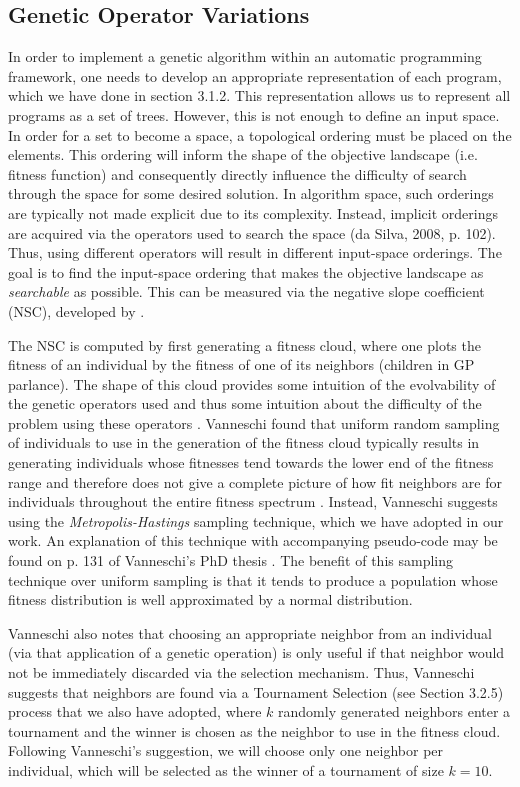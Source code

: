 \documentclass[a4paper,12pt]{report} 	%
\numberwithin{figure}{chapter}
\numberwithin{table}{chapter}
\numberwithin{equation}{chapter}
\begin{document}
\begin{flushleft}
\section{Genetic Operator Variations}
In order to implement a genetic algorithm within an automatic programming framework, one needs to develop an appropriate representation of each program, which we have done in section 3.1.2. This representation allows us to represent all programs as a set of trees. However, this is not enough to define an input space. In order for a set to become a space, a topological ordering must be placed on the elements. This ordering will inform the shape of the objective landscape (i.e. fitness function) and consequently directly influence the difficulty of search through the space for some desired solution. In algorithm space, such orderings are typically not made explicit due to its complexity. Instead, implicit orderings are acquired via the operators used to search the space (da Silva, 2008, p. 102). Thus, using different operators will result in different input-space orderings. The goal is to find the input-space ordering that makes the objective landscape as \emph{searchable} as possible. This can be measured via the negative slope coefficient (NSC), developed by \cite[p. 54]{Vanneschi:2004le}.

The NSC is computed by first generating a fitness cloud, where one plots the fitness of an individual by the fitness of one of its neighbors (children in GP parlance). The shape of this cloud provides some intuition of the evolvability of the genetic operators used and thus some intuition about the difficulty of the problem using these operators \cite[p. 130]{Vanneschi:2004le}. Vanneschi found that uniform random sampling of individuals to use in the generation of the fitness cloud typically results in generating individuals whose fitnesses tend towards the lower end of the fitness range and therefore does not give a complete picture of how fit neighbors are for individuals throughout the entire fitness spectrum \cite[p. 132]{Vanneschi:2004le}. Instead, Vanneschi suggests using the \emph{Metropolis-Hastings} sampling technique, which we have adopted in our work. An explanation of this technique with accompanying pseudo-code may be found on p. 131 of Vanneschi's PhD thesis \cite{Vanneschi:2004le}. The benefit of this sampling technique over uniform sampling is that it tends to produce a population whose fitness distribution is well approximated by a normal distribution.

Vanneschi also notes that choosing an appropriate neighbor from an individual (via that application of a genetic operation) is only useful if that neighbor would not be immediately discarded via the selection mechanism. Thus, Vanneschi suggests that neighbors are found via a Tournament Selection (see Section 3.2.5) process that we also have adopted, where $k$ randomly generated neighbors enter a tournament and the winner is chosen as the neighbor to use in the fitness cloud. Following Vanneschi's suggestion, we will choose only one neighbor per individual, which will be selected as the winner of a tournament of size $k=10$.


\end{flushleft}
\end{document}
